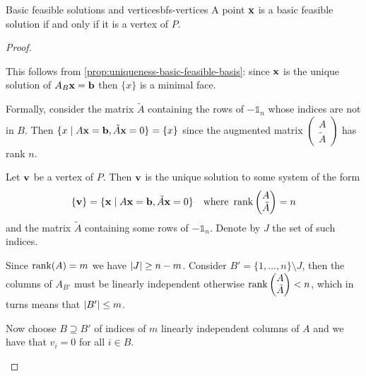 \documentclass[12pt]{extarticle}
\renewcommand{\vec}[1]{\bvec{#1}}
\begin{document}
\begin{proposition}{Basic feasible solutions and vertices}{bfs-vertices}
	A point $\vec x$ is a basic feasible solution if and only if it is a vertex of $P$.
\end{proposition}
\begin{proof}
	\begin{description}[font=\normalfont\itshape]
		\item[Basic feasible solution implies vertex]
		      This follows from \cref{prop:uniqueness-basic-feasible-basis}:
		      since $\vec x$ is the unique solution of $A_B \vec x = \vec b$ then $\{x\}$ is a minimal
		      face.

		      Formally, consider the matrix $\tilde A$ containing the rows of $-\mathds 1_n$ whose
		      indices are not in $B$.
		      Then $\{x \mid A \vec x = \vec b, \tilde A \vec x = 0\} = \{ x\}$ since the augmented
		      matrix $\begin{pmatrix} A \\ \tilde A \end{pmatrix}$ has rank $n$.

		\item[Vertex implies basic feasible solution]
		      Let $\vec v$ be a vertex of $P$.
		      Then $\vec v$ is the unique solution to some system of the form
		      \begin{equation}
			      \{ \vec v \} = \{ \vec x \mid A \vec x = \vec b, \tilde A \vec x = 0\} \quad \text{where }
			      \rank\begin{pmatrix}A \\ \tilde A \end{pmatrix} = n
		      \end{equation}
		      and the matrix $\tilde A$ containing some rows of $-\mathds 1_n$.
		      Denote by $J$ the set of such indices.

		      Since $\rank(A) = m$ we have $\abs{J} \geq n - m$.
		      Consider $B' = \{1, \dots, n\} \setminus J$, then the columns of $A_{B'}$ must
		      be linearly independent otherwise $\rank \begin{pmatrix}A \\ \tilde A \end{pmatrix} < n$,
		      which in turns means that $\abs{B'} \leq m$.

		      Now choose $B \supseteq B'$ of indices of $m$ linearly independent columns of $A$
		      and we have that $v_i = 0$ for all $i \in B$.
		      \qedhere
	\end{description}
\end{proof}
\end{document}
